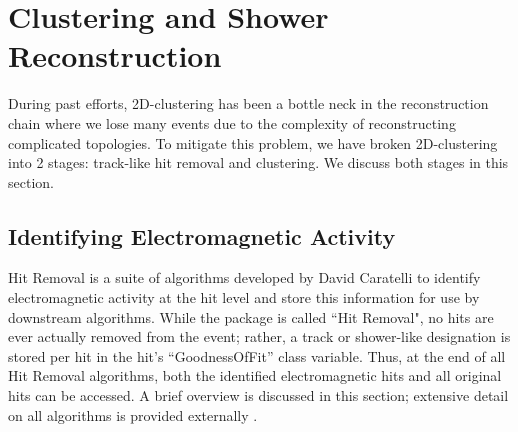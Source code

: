 \documentclass{article}
\begin{document}
\clearpage
\section{Clustering and Shower Reconstruction}
During past efforts, 2D-clustering has been a bottle neck in the reconstruction chain where we lose many events due to the complexity of reconstructing complicated topologies. To mitigate this problem, we have broken 2D-clustering into 2 stages: track-like hit removal and clustering. We discuss both stages in this section.

\subsection{Identifying Electromagnetic Activity}

Hit Removal is a suite of algorithms developed by David Caratelli to identify electromagnetic activity at the hit level and store this information for use by downstream algorithms. While the package is called ``Hit Removal", no hits are ever actually removed from the event; rather, a track or shower-like designation is stored per hit in the hit's ``GoodnessOfFit'' class variable. Thus, at the end of all Hit Removal algorithms, both the identified electromagnetic hits and all original hits can be accessed. A brief overview is discussed in this section; extensive detail on all algorithms is provided externally \cite{bib:davidc_hitremoval}.
\end{document}
